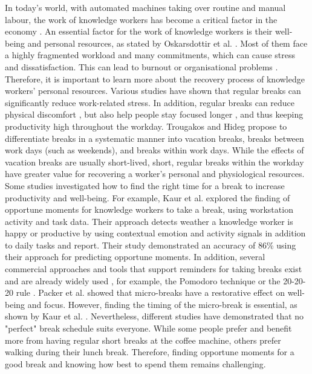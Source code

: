 \documentclass{hasel_thesis}
\begin{document}
In today's world, with automated machines taking over routine and manual labour, the work of knowledge workers has become a critical factor in the economy \cite{Oskarsdottir.2022}. An essential factor for the work of knowledge workers is their well-being and personal resources, as stated by Oskarsdottir et al. \cite{Oskarsdottir.2022}. Most of them face a highly fragmented workload and many commitments, which can cause stress and dissatisfaction. This can lead to burnout or organisational problems \cite{Elkin.1990}. Therefore, it is important to learn more about the recovery process of knowledge workers' personal resources. Various studies \cite{Largo-Wight.2017, KimS.ParkY.&Niu.2017} have shown that regular breaks can significantly reduce work-related stress. In addition, regular breaks can reduce physical discomfort \cite{Waongenngarm.2018}, but also help people stay focused longer \cite{Ariga.2011, Bloom.2014}, and thus keeping productivity high throughout the workday. Trougakos and Hideg \cite{Trougakos.2009} propose to differentiate breaks in a systematic manner into vacation breaks, breaks between work days (such as weekends), and breaks within work days. While the effects of vacation breaks are usually short-lived, short, regular breaks within the workday have greater value for recovering a worker's personal and physiological resources.
Some studies investigated how to find the right time for a break to increase productivity and well-being. For example, Kaur et al. \cite{Kaur.2020} explored the finding of opportune moments for knowledge workers to take a break, using workstation activity and task data. Their approach detects weather a knowledge worker is happy or productive by using contextual emotion and activity signals in addition to daily tasks and report. Their study demonstrated an accuracy of 86\% using their approach for predicting opportune moments. In addition, several commercial approaches and tools that support reminders for taking breaks exist and are already widely used \cite{Alghamdi.2020}, for example, the Pomodoro technique \cite{Cirillo.2006} or the 20-20-20 rule \cite{Min.2019}. Packer et al. \cite{Packer.2021} showed that micro-breaks have a restorative effect on well-being and focus. However, finding the timing of the micro-break is essential, as shown by Kaur et al. \cite{Kaur.2020}. Nevertheless, different studies \cite{KimS.ParkY.&Niu.2017, Berman.2007} have demonstrated that no "perfect" break schedule suits everyone. While some people prefer and benefit more from having regular short breaks at the coffee machine, others prefer walking during their lunch break. Therefore, finding opportune moments for a good break and knowing how best to spend them remains challenging. 
\end{document}
